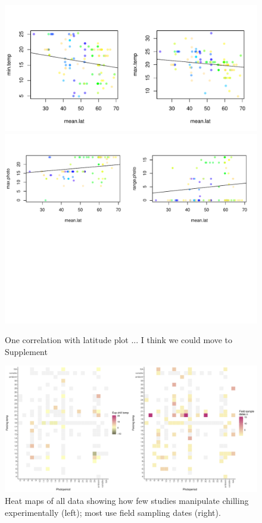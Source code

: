 \documentclass[11pt,letter]{article}
\begin{document}
\begin{figure}[t!]
\centering
\includegraphics[width=1\textwidth]{..//..//analyses/limitingcues/figures/tempxlatminmaxcorr.pdf}
\includegraphics[width=1\textwidth]{..//..//analyses/limitingcues/figures/photoxlatcorr2plots.pdf}
\caption{One correlation with latitude plot ... I think we could move to Supplement}
  \label{fig:lat}
\end{figure}

\clearpage

\begin{figure}[t!]
\centering
\includegraphics[width=1.1\textwidth]{..//..//analyses/limitingcues/figures/heatmapphotoxforcexchill2panel.pdf}
\caption{Heat maps of all data showing how few studies manipulate chilling experimentally (left); most use field sampling dates (right).}
  \label{fig:heatmaps} 
\end{figure}
\end{document}
